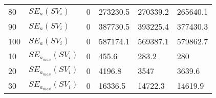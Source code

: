 \begin{table}[H]
\begin{tabular}{l l | l l | l l}
		80                                                          & $SE_{a}(SV_i)$                                                    & 0                                                                &     273230.5                                                              & 270339.2                                                         & 265640.1                                                                \\
		90                                                          & $SE_{a}(SV_i)$                                                    & 0                                                                &    387730.5                                                           & 393225.4                                                         & 377430.3                                                                \\
		100                                                         & $SE_{a}(SV_i)$                                                    & 0                                                                &      587174.1                                                             & 569387.1                                                         & 579862.7                                                                \\
		10                                                          & $SE_{a_{max}}(SV_i)$                                                        & 0                                                                &    455.6                                                            & 283.2                                                            & 280                                                                     \\
		20                                                          & $SE_{a_{max}}(SV_i)$                                                        & 0                                                                &     4196.8                                                               & 3547                                                             & 3639.6                                                                  \\
		30                                                          & $SE_{a_{max}}(SV_i)$                                                        & 0                                                                &    16336.5                                                                & 14722.3                                                          & 14619.9                                                                 \\

\end{tabular}
\end{table}
